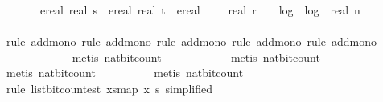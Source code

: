 \begin{isabellebody}
\ \ \ \ \ \ {\isacharplus}{\kern0pt}\ {\isacharparenleft}{\kern0pt}ereal\ {\isacharparenleft}{\kern0pt}real\ s{\isacharparenright}{\kern0pt}\ {\isacharasterisk}{\kern0pt}\ {\isacharparenleft}{\kern0pt}{\isacharparenleft}{\kern0pt}ereal\ {\isacharparenleft}{\kern0pt}real\ t{\isacharparenright}{\kern0pt}\ {\isacharasterisk}{\kern0pt}\ {\isacharparenleft}{\kern0pt}ereal\ {\isacharparenleft}{\kern0pt}{}{}\ {\isacharplus}{\kern0pt}\ {}\ {\isacharasterisk}{\kern0pt}\ real\ r\ {\isacharplus}{\kern0pt}\ {}\ {\isacharasterisk}{\kern0pt}\ log\ {}\ {\isacharparenleft}{\kern0pt}log\ {}\ {\isacharparenleft}{\kern0pt}real\ {\isacharparenleft}{\kern0pt}n\ {\isacharplus}{\kern0pt}\ {}{\isacharparenright}{\kern0pt}{\isacharparenright}{\kern0pt}{\isacharparenright}{\kern0pt}{\isacharparenright}{\kern0pt}\isanewline
\ \ \ \ \ \ \ \ \ \ \ {\isacharplus}{\kern0pt}\ {}{\isacharparenright}{\kern0pt}\ {\isacharplus}{\kern0pt}\ {}{\isacharparenright}{\kern0pt}\ {\isacharplus}{\kern0pt}\ {}{\isacharparenright}{\kern0pt}\ {\isacharplus}{\kern0pt}\ {}{\isacharparenright}{\kern0pt}{\isachardoublequoteclose}\isanewline
\ \ \ \ \ \ \isamarkupfalse%
\ {\isacharparenleft}{\kern0pt}rule\ add{\isacharunderscore}{\kern0pt}mono{\isacharcomma}{\kern0pt}\ rule\ add{\isacharunderscore}{\kern0pt}mono{\isacharcomma}{\kern0pt}\ rule\ add{\isacharunderscore}{\kern0pt}mono{\isacharcomma}{\kern0pt}\ rule\ add{\isacharunderscore}{\kern0pt}mono{\isacharcomma}{\kern0pt}\ rule\ add{\isacharunderscore}{\kern0pt}mono{\isacharparenright}{\kern0pt}\isanewline
\ \ \ \ \ \ \ \ \ \ \ \isamarkupfalse%
\ {\isacharparenleft}{\kern0pt}metis\ nat{\isacharunderscore}{\kern0pt}bit{\isacharunderscore}{\kern0pt}count{\isacharparenright}{\kern0pt}\isanewline
\ \ \ \ \ \ \ \ \ \ \isamarkupfalse%
\ {\isacharparenleft}{\kern0pt}metis\ nat{\isacharunderscore}{\kern0pt}bit{\isacharunderscore}{\kern0pt}count{\isacharparenright}{\kern0pt}\isanewline
\ \ \ \ \ \ \ \ \ \isamarkupfalse%
\ {\isacharparenleft}{\kern0pt}metis\ nat{\isacharunderscore}{\kern0pt}bit{\isacharunderscore}{\kern0pt}count{\isacharparenright}{\kern0pt}\isanewline
\ \ \ \ \ \ \ \ \isamarkupfalse%
\ {\isacharparenleft}{\kern0pt}metis\ nat{\isacharunderscore}{\kern0pt}bit{\isacharunderscore}{\kern0pt}count{\isacharparenright}{\kern0pt}\isanewline
\ \ \ \ \ \ \ \isamarkupfalse%
\ {\isacharparenleft}{\kern0pt}rule\ list{\isacharunderscore}{\kern0pt}bit{\isacharunderscore}{\kern0pt}count{\isacharunderscore}{\kern0pt}est{\isacharbrackleft}{\kern0pt}\ xs{\isacharequal}{\kern0pt}{\isachardoublequoteopen}map\ x\ {\isacharbrackleft}{\kern0pt}{}{\isachardot}{\kern0pt}{\isachardot}{\kern0pt}{\isacharless}{\kern0pt}s{\isacharbrackright}{\kern0pt}{\isachardoublequoteclose}{\isacharcomma}{\kern0pt}\ simplified{\isacharbrackright}{\kern0pt}{\isacharparenright}{\kern0pt}\isanewline

\end{isabellebody}
